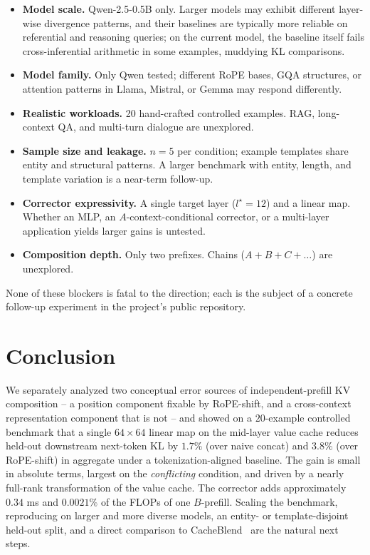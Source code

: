 \documentclass[11pt]{article}
\begin{document}
\begin{itemize}[leftmargin=*]
    \item \textbf{Model scale.} Qwen-2.5-0.5B only. Larger models may exhibit different layer-wise divergence patterns, and their baselines are typically more reliable on referential and reasoning queries; on the current model, the baseline itself fails cross-inferential arithmetic in some examples, muddying KL comparisons.
    \item \textbf{Model family.} Only Qwen tested; different RoPE bases, GQA structures, or attention patterns in Llama, Mistral, or Gemma may respond differently.
    \item \textbf{Realistic workloads.} 20 hand-crafted controlled examples. RAG, long-context QA, and multi-turn dialogue are unexplored.
    \item \textbf{Sample size and leakage.} $n=5$ per condition; example templates share entity and structural patterns. A larger benchmark with entity, length, and template variation is a near-term follow-up.
    \item \textbf{Corrector expressivity.} A single target layer ($l^\star=12$) and a linear map. Whether an MLP, an $A$-context-conditional corrector, or a multi-layer application yields larger gains is untested.
    \item \textbf{Composition depth.} Only two prefixes. Chains ($A + B + C + \ldots$) are unexplored.
\end{itemize}

None of these blockers is fatal to the direction; each is the subject of a concrete follow-up experiment in the project's public repository.

\section{Conclusion}

We separately analyzed two conceptual error sources of independent-prefill KV composition -- a position component fixable by RoPE-shift, and a cross-context representation component that is not -- and showed on a $20$-example controlled benchmark that a single $64\times64$ linear map on the mid-layer value cache reduces held-out downstream next-token KL by $1.7\%$ (over naive concat) and $3.8\%$ (over RoPE-shift) in aggregate under a tokenization-aligned baseline. The gain is small in absolute terms, largest on the \emph{conflicting} condition, and driven by a nearly full-rank transformation of the value cache. The corrector adds approximately $0.34$ ms and $0.0021\%$ of the FLOPs of one $B$-prefill. Scaling the benchmark, reproducing on larger and more diverse models, an entity- or template-disjoint held-out split, and a direct comparison to CacheBlend~\citep{yao2024cacheblend} are the natural next steps.
\end{document}
